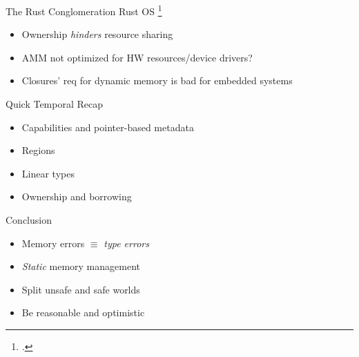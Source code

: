 \documentclass[aspectratio=169]{beamer}
\begin{document}
\begin{frame}{The Rust Conglomeration}
Rust OS \footcite{levy_ownership_2015}
    \begin{itemize}
        \item Ownership \emph{hinders} resource sharing
        \item AMM not optimized for HW resources/device drivers?
        \item Closures' req for dynamic memory is bad for embedded systems
    \end{itemize}
\end{frame}

\begin{frame}{Quick Temporal Recap}
    \begin{itemize}
      \item Capabilities and pointer-based metadata 
      \item Regions 
      \item Linear types 
      \item Ownership and borrowing 
    \end{itemize}
\end{frame}

\begin{frame}{Conclusion}
    \begin{itemize}[<+->]
        \item Memory errors $\equiv$ \emph{type errors}
        \item \emph{Static} memory management 
        \item Split unsafe and safe worlds 
        \item Be reasonable and optimistic 
    \end{itemize}
\end{frame}
\end{document}
